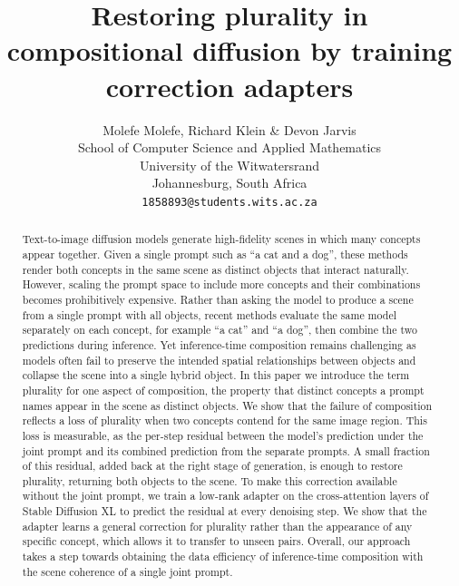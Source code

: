 \documentclass{article} %
\title{Restoring plurality in compositional diffusion by training correction adapters}
\author{Molefe Molefe, Richard Klein \& Devon Jarvis \\
School of Computer Science and Applied Mathematics \\
University of the Witwatersrand \\
Johannesburg, South Africa \\
\texttt{1858893@students.wits.ac.za}}
\begin{document}
\raggedbottom

\maketitle

\begin{abstract}
Text-to-image diffusion models generate high-fidelity scenes in which many concepts appear together. Given a single prompt such as ``a cat and a dog'', these methods render both concepts in the same scene as distinct objects that interact naturally. However, scaling the prompt space to include more concepts and their combinations becomes prohibitively expensive. Rather than asking the model to produce a scene from a single prompt with all objects, recent methods evaluate the same model separately on each concept, for example ``a cat'' and ``a dog'', then combine the two predictions during inference. Yet inference-time composition remains challenging as models often fail to preserve the intended spatial relationships between objects and collapse the scene into a single hybrid object. In this paper we introduce the term plurality for one aspect of composition, the property that distinct concepts a prompt names appear in the scene as distinct objects. We show that the failure of composition reflects a loss of plurality when two concepts contend for the same image region. This loss is measurable, as the per-step residual between the model's prediction under the joint prompt and its combined prediction from the separate prompts. A small fraction of this residual, added back at the right stage of generation, is enough to restore plurality, returning both objects to the scene. To make this correction available without the joint prompt, we train a low-rank adapter on the cross-attention layers of Stable Diffusion XL to predict the residual at every denoising step. We show that the adapter learns a general correction for plurality rather than the appearance of any specific concept, which allows it to transfer to unseen pairs. Overall, our approach takes a step towards obtaining the data efficiency of inference-time composition with the scene coherence of a single joint prompt.
\end{abstract}
\end{document}
